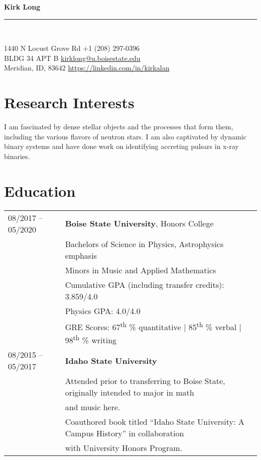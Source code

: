 \documentclass[11pt]{article}
\newcommand{\makeheading}[2]%
        {\begin{minipage}[t]{\textwidth}%
                 {\LARGE \bfseries #1} \\[-0.3\baselineskip]%
                 \rule{\columnwidth}{1.5pt}\\[0.1\baselineskip]
         \end{minipage}}
\begin{document}
\makeheading{Kirk Long}{}

1440 N Locust Grove Rd				\hfill	+1 (208) 297-0396\\
BLDG 34 APT B	\hfill	\href{mailto:kirklong@u.boisestate.edu}{kirklong@u.boisestate.edu}\\
Meridian, ID, 83642			\hfill	\url{https://linkedin.com/in/kirkalan}



\section{Research Interests}
 I am fascinated by dense stellar objects and the processes that form them, including the various flavors of neutron stars. I am also captivated by dynamic binary systems and have done work on identifying accreting pulsars in x-ray binaries.

\section{Education}
\begin{tabular}{ll}
08/2017 -- 05/2020	& 	\textbf{Boise State University}, Honors College \vspace{1mm} \\
			&	Bachelors of Science in Physics, Astrophysics emphasis\\
			&	Minors in Music and Applied Mathematics\vspace{1mm} \\
			&	Cumulative GPA (including transfer credits): 3.859/4.0\\
      & Physics GPA: 4.0/4.0\\
      & GRE Scores: 67\textsuperscript{th} \% quantitative | 85\textsuperscript{th} \% verbal | 98\textsuperscript{th} \% writing \vspace{2mm} \\
08/2015 -- 05/2017 & \textbf{Idaho State University} \vspace{1mm} \\
      & Attended prior to transferring to Boise State, originally intended to major in math\\
      & and music here.\\
      & Coauthored book titled ``Idaho State University: A Campus History'' in collaboration\\
      & with University Honors Program.\\

\end{tabular}
\end{document}
